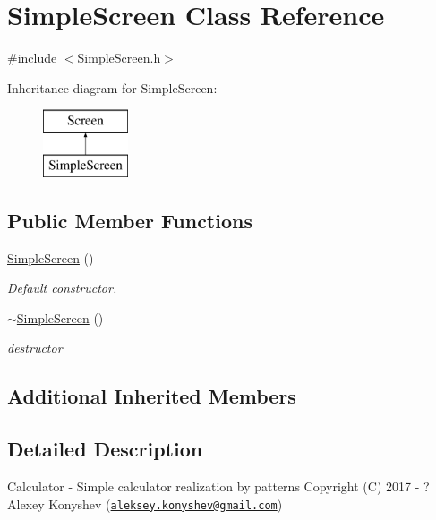 \hypertarget{class_simple_screen}{}\section{Simple\+Screen Class Reference}
\label{class_simple_screen}


{\ttfamily \#include $<$Simple\+Screen.\+h$>$}

Inheritance diagram for Simple\+Screen\+:\begin{figure}[H]
\begin{center}
\leavevmode
\includegraphics[height=2.000000cm]{class_simple_screen}
\end{center}
\end{figure}
\subsection*{Public Member Functions}
\begin{DoxyCompactItemize}
\item 
\hyperlink{class_simple_screen_af27275c09a784299846ccbabce46db2f}{Simple\+Screen} ()
\begin{DoxyCompactList}\small\item\em Default constructor. \end{DoxyCompactList}\item 
\hypertarget{class_simple_screen_a6cb5a9e1c39a1d5fa6b80a95dc5ec817}{}\hyperlink{class_simple_screen_a6cb5a9e1c39a1d5fa6b80a95dc5ec817}{$\sim$\+Simple\+Screen} ()\label{class_simple_screen_a6cb5a9e1c39a1d5fa6b80a95dc5ec817}

\begin{DoxyCompactList}\small\item\em destructor \end{DoxyCompactList}\end{DoxyCompactItemize}
\subsection*{Additional Inherited Members}


\subsection{Detailed Description}
Calculator -\/ Simple calculator realization by patterns Copyright (C) 2017 -\/ ? Alexey Konyshev (\href{mailto:aleksey.konyshev@gmail.com}{\tt aleksey.\+konyshev@gmail.\+com})

